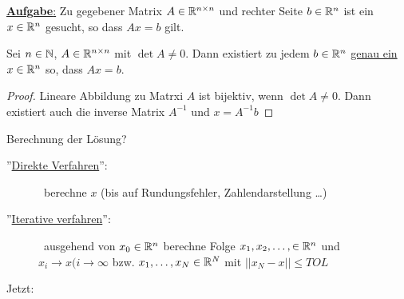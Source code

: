\documentclass[../Skript.tex]{subfiles}
\begin{document}
\underline{\textbf{Aufgabe}:} Zu gegebener Matrix $A\in\mathbb{R}^{n\times n}$ 
und rechter Seite $b\in \mathbb{R}^n$
ist ein $x\in \mathbb{R}^n$ gesucht, so dass $Ax=b$ gilt.
\begin{theorem}
    Sei $n\in \mathbb{N}$, $A\in \mathbb{R}^{n\times n}$ mit $\det{A} \neq 0$. Dann 
    existiert
    zu jedem $b\in \mathbb{R}^n$ \underline{genau ein} $x\in \mathbb{R}^n$ so, dass 
    $Ax=b$.
\end{theorem}
\begin{proof}
    Lineare Abbildung zu Matrxi $A$ ist bijektiv, wenn $\det A \neq 0$. 
    Dann existiert auch
    die inverse Matrix $A^{-1}$ und $x=A^{-1}b$
\end{proof}

Berechnung der Lösung?
\begin{description}
    \item[''\underline{Direkte Verfahren}'':]\ berechne \(x\) (bis auf 
    Rundungsfehler, Zahlendarstellung \dots )
    \item[''\underline{Iterative verfahren}'':]\ ausgehend von \(x_0 \in 
    \mathbb{R}^n\) berechne Folge \(x_1, x_2, \dots ,\in \mathbb{R}^n\) und \(x_i\to x 
    (i\to \infty\)
    bzw. \(x_1,\dots,x_N\in\mathbb{R}^N\) mit \(\vert\vert x_N-x\vert\vert\leq 
    TOL\)
\end{description}
Jetzt:
\end{document}
